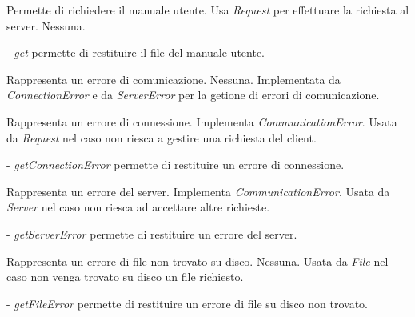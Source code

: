 Permette di richiedere il manuale utente.
Usa \textit{Request} per effettuare la richiesta al server.
Nessuna.
\begin{elencopuntato}[\normindent]
\item[-] \textit{get} permette di restituire il file del manuale utente.
\end{elencopuntato}

Rappresenta un errore di comunicazione.
Nessuna.
Implementata da \textit{ConnectionError} e da \textit{ServerError} per la getione di errori di comunicazione.

Rappresenta un errore di connessione.
Implementa \textit{CommunicationError}.
Usata da \textit{Request} nel caso non riesca a gestire una richiesta del client.
\begin{elencopuntato}[\normindent]
\item[-] \textit{getConnectionError} permette di restituire un errore di connessione.
\end{elencopuntato}

Rappresenta un errore del server.
Implementa \textit{CommunicationError}.
Usata da \textit{Server} nel caso non riesca ad accettare altre richieste.
\begin{elencopuntato}[\normindent]
\item[-] \textit{getServerError} permette di restituire un errore del server.
\end{elencopuntato}

Rappresenta un errore di file non trovato su disco.
Nessuna.
Usata da \textit{File} nel caso non venga trovato su disco un file richiesto.
\begin{elencopuntato}[\normindent]
\item[-] \textit{getFileError} permette di restituire un errore di file su disco non trovato.
\end{elencopuntato}

